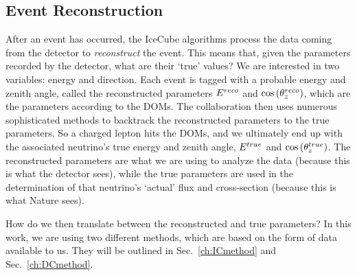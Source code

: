 \subsection{Event Reconstruction}
After an event has occurred, the IceCube algorithms process the data coming from the detector to \emph{reconstruct} the event. 
This means that, given the parameters recorded by the detector, what are their `true' values?
We are interested in two variables: energy and direction. Each event is tagged with a probable energy and zenith angle, 
called the reconstructed parameters $E^{reco}$ and $\cos{(\theta_z^{reco})}$, which are the parameters according to the DOMs.
The collaboration then uses numerous sophisticated methods to backtrack the reconstructed parameters to the true parameters. 
So a charged lepton hits the DOMs, and we ultimately end up with the associated neutrino's true energy and zenith angle, $E^{true}$ and $\cos{(\theta_z^{true})}$. 
The reconstructed parameters are what we are using to analyze the data (because this is what the detector sees), while the true parameters are used in the 
determination of that neutrino's `actual' flux and cross-section (because this is what Nature sees).

How do we then translate between the reconstructed and true parameters? 
In this work, we are using two different methods, which are based on the form of data available to us. 
They will be outlined in Sec.~\ref{ch:ICmethod} and Sec.~\ref{ch:DCmethod}.



% 
% 
% 